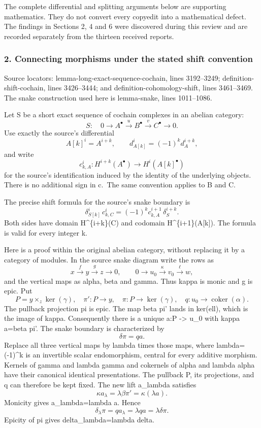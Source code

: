 The complete differential and splitting arguments below are supporting mathematics. They do not convert every copyedit into a mathematical defect. The findings in Sections 2, 4 and 6 were discovered during this review and are recorded separately from the thirteen received reports.

\subsubsection{2. Connecting morphisms under the stated shift convention}\label{connecting-morphisms-under-the-stated-shift-convention}

Source locators: lemma-long-exact-sequence-cochain, lines 3192--3249; definition-shift-cochain, lines 3426--3444; and definition-cohomology-shift, lines 3461--3469. The snake construction used here is lemma-snake, lines 1011--1086.

Let S be a short exact sequence of cochain complexes in an abelian category: \[
S:\quad 0\longrightarrow A^\bullet\xrightarrow{u}B^\bullet
\xrightarrow{v}C^\bullet\longrightarrow0.
\] Use exactly the source's differential \[
A[k]^i=A^{i+k},\qquad d_{A[k]}^i=(-1)^k d_A^{i+k},
\] and write \[
c_{k,A}^i:H^{i+k}(A^\bullet)\longrightarrow H^i(A[k]^\bullet)
\] for the source's identification induced by the identity of the underlying objects. There is no additional sign in c.~The same convention applies to B and C.

The precise shift formula for the source's snake boundary is \[
\boxed{\quad
\delta_{S[k]}^i\,c_{k,C}^i
 =(-1)^k c_{k,A}^{i+1}\,\delta_S^{i+k}.
\quad}                                                    \tag{2.1}
\] Both sides have domain H\^{}\{i+k\}(C) and codomain H\^{}\{i+1\}(A{[}k{]}). The formula is valid for every integer k.

Here is a proof within the original abelian category, without replacing it by a category of modules. In the source snake diagram write the rows as \[
x\xrightarrow{f}y\xrightarrow{g}z\longrightarrow0,\qquad
0\longrightarrow u_0\xrightarrow{\kappa}v_0
\xrightarrow{\ell}w,
\] and the vertical maps as alpha, beta and gamma. Thus kappa is monic and g is epic. Put \[
P=y\times_z\ker(\gamma),\quad
\pi':P\longrightarrow y,\quad
\pi:P\longrightarrow\ker(\gamma),\quad
q:u_0\longrightarrow\operatorname{coker}(\alpha).
\] The pullback projection pi is epic. The map beta pi' lands in ker(ell), which is the image of kappa. Consequently there is a unique a:P -\textgreater{} u\_0 with kappa a=beta pi'. The snake boundary is characterized by \[
\delta\pi=qa.
\] Replace all three vertical maps by lambda times those maps, where lambda=(-1)\^{}k is an invertible scalar endomorphism, central for every additive morphism. Kernels of gamma and lambda gamma and cokernels of alpha and lambda alpha have their canonical identical presentations. The pullback P, its projections, and q can therefore be kept fixed. The new lift a\_lambda satisfies \[
\kappa a_\lambda=\lambda\beta\pi'
 =\kappa(\lambda a).
\] Monicity gives a\_lambda=lambda a. Hence \[
\delta_\lambda\pi=q a_\lambda
 =\lambda q a=\lambda\delta\pi.
\] Epicity of pi gives delta\_lambda=lambda delta.

